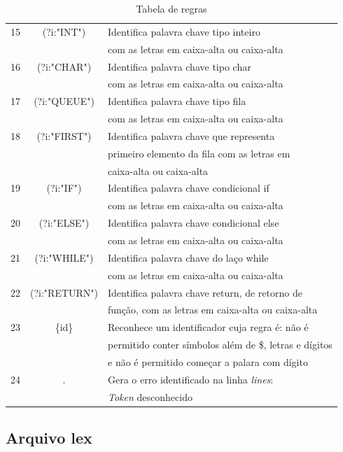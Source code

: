 \documentclass[12pt]{article}
\begin{document}
\begin{table}
\begin{tabular}{|c || c  l |}
 \hline
 15 & (?i:"INT")& Identifica palavra chave tipo inteiro \\&& com as letras em caixa-alta ou caixa-alta \\
 \hline
 16 & (?i:"CHAR") & Identifica palavra chave tipo char \\&& com as letras em caixa-alta ou caixa-alta \\
 \hline
 17 & (?i:"QUEUE")& Identifica palavra chave tipo fila \\&& com as letras em caixa-alta ou caixa-alta \\
 \hline
 18 & (?i:"FIRST")& Identifica palavra chave que representa \\&&  primeiro elemento da fila com as letras em \\&& caixa-alta ou caixa-alta  \\
 \hline
 19 & (?i:"IF")& Identifica palavra chave condicional if \\&& com as letras em caixa-alta ou caixa-alta \\
 \hline
 20 & (?i:"ELSE")& Identifica palavra chave condicional else \\&& com as letras em caixa-alta ou caixa-alta \\
 \hline
 21 & (?i:"WHILE")& Identifica palavra chave do laço while \\&& com as letras em caixa-alta ou caixa-alta \\
 \hline
 22 & (?i:"RETURN")& Identifica palavra chave return, de retorno de \\&& função, com as letras em caixa-alta ou caixa-alta \\
 \hline
 23 & \{id\} & Reconhece um identificador cuja regra é: não é \\&& permitido conter símbolos além de \$, letras e  dígitos \\&& e não é permitido começar a palara com dígito \\
 \hline
 24 & . & {\color{red}Gera o erro identificado na linha \textit{lines}:} \\&& {\color{red}\textit{Token} desconhecido} \\
 \hline
\end{tabular}
\caption{Tabela de regras}
\label{TabelaRegras}
\end{table}


\subsection{Arquivo lex}
\end{document}
